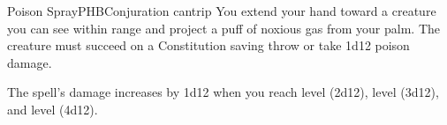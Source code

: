 \begin{spell}{Poison Spray}{PHB}{Conjuration cantrip}
{
}
You extend your hand toward a creature you can see within
range and project a puff of noxious gas from your palm.
The creature must succeed on a Constitution saving throw
or take 1d12 poison damage.

 The spell's damage increases by
1d12 when you reach  level (2d12),
 level (3d12), and  level (4d12).
\end{spell}
